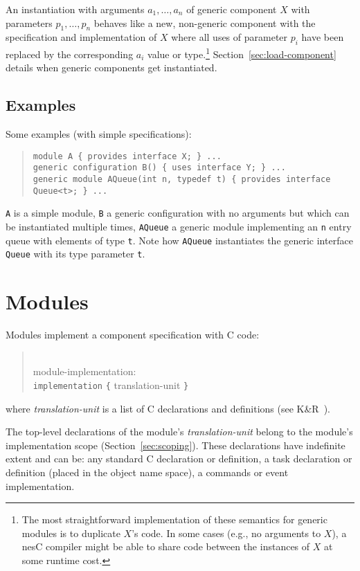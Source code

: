 \documentclass[11pt,letterpaper]{article}
\newcommand{\kw}[1]{{\tt #1}}
\newcommand{\code}[1]{{\tt #1}}
\newcommand{\nesc}{nesC\xspace}
\newcommand{\grammarshift}{\vspace*{-.7cm}}
\newcommand{\grammarindent}{\hspace*{2cm}\= \\ \kill}
\begin{document}
An instantiation with arguments $a_1, \ldots, a_n$ of generic component $X$
with parameters $p_1, \ldots, p_n$ behaves like a new, non-generic component
with the specification and implementation of $X$ where all uses of
parameter $p_i$ have been replaced by the corresponding $a_i$ value or
type.\footnote{The most straightforward implementation of these semantics
for generic modules is to duplicate $X$'s code. In some cases (e.g., no
arguments to $X$), a \nesc compiler might be able to share code between the
instances of $X$ at some runtime cost.} Section~\ref{sec:load-component}
details when generic components get instantiated.


\subsection{Examples}

Some examples (with simple specifications):
\begin{quote}
  \begin{verbatim}
module A { provides interface X; } ...
generic configuration B() { uses interface Y; } ...
generic module AQueue(int n, typedef t) { provides interface Queue<t>; } ...
  \end{verbatim}
\end{quote}
\code{A} is a simple module, \code{B} a generic configuration with no
arguments but which can be instantiated multiple times, \code{AQueue}
a generic module implementing an \code{n} entry queue with elements of
type \code{t}. Note how \code{AQueue} instantiates the generic interface
\code{Queue} with its type parameter \code{t}.

\section{Modules}
\label{sec:module}

Modules implement a component specification with C code:
\begin{quote} \grammarshift \em \begin{tabbing}
\grammarindent
module-implementation:\\
\>	\kw{implementation} \kw{\{} translation-unit \kw{\}}\\
\end{tabbing} \end{quote}
where \emph{translation-unit} is a list of C declarations and definitions
(see K\&R~\cite[pp234--239]{kandr}). 

The top-level declarations of the module's \emph{translation-unit} belong
to the module's implementation scope (Section~\ref{sec:scoping}). These
declarations have indefinite extent and can be: any standard C declaration
or definition, a task declaration or definition (placed in the object name
space), a commands or event implementation.
\end{document}
